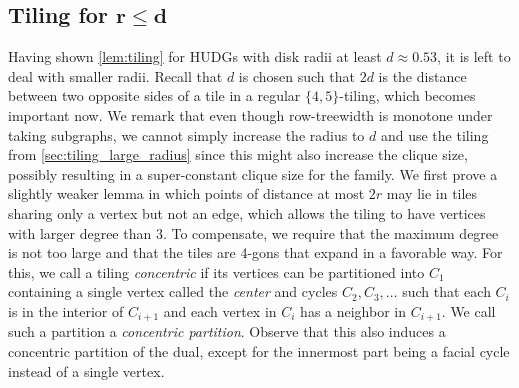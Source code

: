 \documentclass[11pt]{article}
\newtheorem{lemma}[theorem]{Lemma}
\providecommand{\todo}[2][]{}
\newcommand{\Thomas}[1]{}
\begin{document}
\subsection{Tiling for \texorpdfstring{$ \bm{r \leq d} $}{r < d}}
\label{sec:tiling_small_radius}
%
%
Having shown \cref{lem:tiling} for HUDGs with disk radii at least $ d \approx 0.53 $, it is left to deal with smaller radii.
Recall that $ d $ is chosen such that $ 2d $ is the distance between two opposite sides of a tile in a regular $ \{ 4, 5 \} $-tiling, which becomes important now.
We remark that even though row-treewidth is monotone under taking subgraphs, we cannot simply increase the radius to $ d $ and use the tiling from \cref{sec:tiling_large_radius} since this might also increase the clique size, possibly resulting in a super-constant clique size for the family.
We first prove a slightly weaker lemma in which points of distance at most $ 2r $ may lie in tiles sharing only a vertex but not an edge, which allows the tiling to have vertices with larger degree than 3.
To compensate, we require that the maximum degree is not too large and that the tiles are 4-gons that expand in a favorable way.
For this, we call a tiling \emph{concentric} if its vertices can be partitioned into $ C_1 $ containing a single vertex called the \emph{center} and cycles $ C_2, C_3, \dots $ such that each $ C_i $ is in the interior of $ C_{i + 1} $ and each vertex in $ C_i $ has a neighbor in $ C_{i + 1} $.
We call such a partition a \emph{concentric partition}.
Observe that this also induces a concentric partition of the dual, except for the innermost part being a facial cycle instead of a single vertex.
%
%
\end{document}
